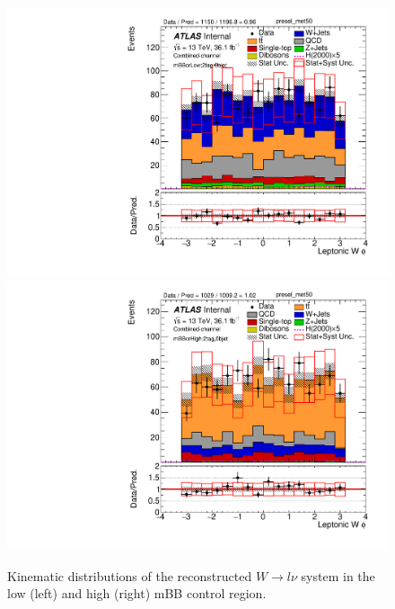 \begin{figure}[!h]
\begin{center}
\includegraphics[scale=0.33]{./figures/boosted/PlotByMbbRegions/DataMC_2tag_0bjet_mbbcrLow_lepton_presel_met50_WlepPhi}                                                                             
\includegraphics[scale=0.33]{./figures/boosted/PlotByMbbRegions/DataMC_2tag_0bjet_mbbcrHigh_lepton_presel_met50_WlepPhi}                                                                            
\caption{Kinematic distributions of the reconstructed $W \to l\nu$ system in the low (left) and high (right) mBB control region.}
\label{fig:boosted_mbbcrHighLow_wlep}
\end{center}
\end{figure}

